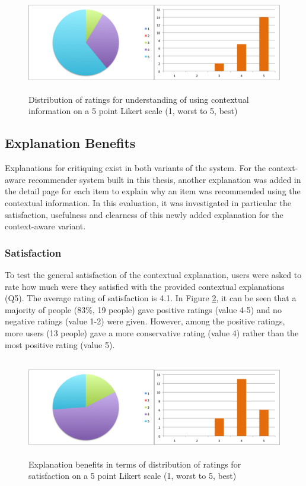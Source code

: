 \begin{figure}[H]
	\centering
	\includegraphics[height=1.7in]{figures/contextBenefits.png}
	\caption{Distribution of ratings for understanding of using contextual information on a 5 point Likert scale (1, worst to 5, best)}
	\label{fig:contextBenefits}
\end{figure}

\subsection{Explanation Benefits} \label{sec:results_eb}

Explanations for critiquing exist in both variants of the system. For the context-aware recommender system built in this thesis, another explanation was added in the detail page for each item to explain why an item was recommended using the contextual information. In this evaluation, it was investigated in particular the satisfaction, usefulness and clearness of this newly added explanation for the context-aware variant.

\subsubsection{Satisfaction} \label{sec:results_eb_s}

To test the general satisfaction of the contextual explanation, users were asked to rate how much were they satisfied with the provided contextual explanations (Q5). The average rating of satisfaction is 4.1. In Figure \ref{fig:satisfaction}, it can be seen that a majority of people (83\%, 19 people) gave positive ratings (value 4-5) and no negative ratings (value 1-2) were given. However, among the positive ratings, more users (13 people) gave a more conservative rating (value 4) rather than the most positive rating (value 5).

\begin{figure}[H]
	\centering
	\includegraphics[height=1.7in]{figures/satisfaction.png}
	\caption{Explanation benefits in terms of distribution of ratings for satisfaction on a 5 point Likert scale (1, worst to 5, best)}
	\label{fig:satisfaction}
\end{figure}

